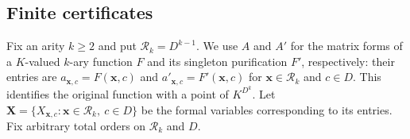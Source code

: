 \documentclass[11pt,letterpaper,onecolumn]{article}
\theoremstyle{plain}
\theoremstyle{definition}
\theoremstyle{remark}
\begin{document}
\subsection{Finite certificates}
\label{subsec:finite-bo-certificates}

Fix an arity $k\ge2$ and put $\mathcal R_k=D^{k-1}$.  We use $A$ and $A'$
for the matrix forms of a $K$-valued $k$-ary function $F$ and its singleton
purification $F'$, respectively: their entries are
$a_{\mathbf x,c}=F(\mathbf x,c)$ and
$a'_{\mathbf x,c}=F'(\mathbf x,c)$ for
$\mathbf x\in\mathcal R_k$ and $c\in D$.  This identifies the original
function with a point of $K^{D^k}$.  Let
$\mathbf X=\{X_{\mathbf x,c}:\mathbf x\in\mathcal R_k,\ c\in D\}$ be
the formal variables corresponding to its entries.  Fix arbitrary total
orders on $\mathcal R_k$ and $D$.
\end{document}
